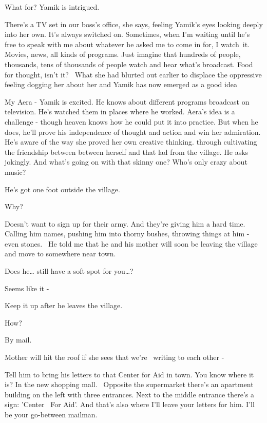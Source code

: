\documentclass[12pt]{book}
\begin{document}
{\textquotedbl}What for?{\textquotedbl} Yamik is intrigued.

{\textquotedbl}There's a TV set in our boss's office,{\textquotedbl} she says, feeling Yamik's eyes looking deeply into
her own. {\textquotedbl}It's always switched on. Sometimes, when I'm waiting until he's free to speak with me about
whatever he asked me to come in for, I watch~it. Movies, news, all kinds of programs. Just imagine that hundreds of
people, thousands, tens of thousands of people watch and hear what's broadcast. Food for thought, isn't
it?{\textquotedbl}~ What she had blurted out earlier to displace the oppressive feeling dogging her about her and Yamik
has now emerged as a good idea

{\textquotedbl}My Aera -{\textquotedbl} Yamik is excited. He knows about different programs broadcast on television.
He's watched them in places where he worked. Aera's idea is a challenge -\newline
 though heaven knows how he could put it into practice. But when he does, he'll prove his independence of thought and
action and win her admiration. He's aware of the way she proved her own creative thinking{. }through
cultivating the friendship between between herself and that lad from the village. He asks jokingly. {\textquotedbl}And
what's going on with that skinny one? Who's only crazy about music?{\textquotedbl}

{\textquotedbl}He's got one foot outside the village.{\textquotedbl}

{\textquotedbl}Why?{\textquotedbl}

{\textquotedbl}Doesn't want to sign up for their army. And they're giving him a hard time. Calling him names, pushing
him into thorny bushes, throwing things at him - even stones. ~He told me that he and his mother will soon be leaving
the village and move to somewhere near town.{\textquotedbl}

{\textquotedbl}Does he{\dots} still have a soft spot for you{\dots}?{\textquotedbl}

{\textquotedbl}Seems like it -{\textquotedbl}

{\textquotedbl}Keep it up after he leaves the village.{\textquotedbl}

{\textquotedbl}How?{\textquotedbl}

{\textquotedbl}By mail.{\textquotedbl}

{\textquotedbl}Mother will hit the roof if she sees that we're \ writing to each other -{\textquotedbl}

{\textquotedbl}Tell him to bring his letters to that Center for Aid in town. You know where it is? In the new shopping
mall. \ Opposite the supermarket there's an apartment building on the left with three entrances. Next to the middle
entrance there's a sign: 'Center \ For Aid'. And that's also where I'll leave your letters for him. I'll be your
go-between mailman.{\textquotedbl}
\end{document}

